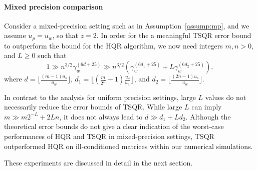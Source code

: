 \documentclass[review,onefignum,onetabnum]{siamart190516}
\begin{document}
\paragraph{Mixed precision comparison}Consider a mixed-precision setting such as in Assumption~\ref{assump:mp}, and we assume $u_p=u_w$, so that $z=2$.
In order for the a meaningful TSQR error bound to outperform the bound for the HQR algorithm, we now need integers $m, n > 0$, and $L\geq 0$ such that
\begin{equation*}
1\gg n^{3/2}\gamma_w^{(6d + 25)} \gg n^{3/2}(\gamma_w^{(6d_1+ 25)}+L\gamma_w^{(6d_2+ 25)}),
\end{equation*}
where $d=\lfloor\frac{(m-1) u_s}{u_w}\rfloor$, $d_1 = \lfloor{(\frac{m}{2^L}-1)\frac{u_s}{u_w}\rfloor}$, and $d_2 =\lfloor \frac{(2n-1)u_s}{u_w}\rfloor$. 

In contrast to the analysis for uniform precision settings, large $L$ values do not necessarily reduce the error bounds of TSQR. 
While large $L$ can imply $m\gg m2^{-L}+2Ln$, it does not always lead to $d \gg d_1+Ld_2$.
Although the theoretical error bounds do not give a clear indication of the worst-case performances of HQR and TSQR in mixed-precision settings, TSQR outperformed HQR on ill-conditioned matrices within our numerical simulations.

These experiments are discussed in detail in the next section.%
\end{document}
